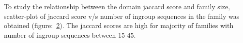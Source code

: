 \documentclass{article}
\begin{document}
		\begin{figure}
			\caption{}
			\label{fig:hist_domain_jaccard_scores_lgf5}
		\end{figure}
		
		To study the relationship between the domain jaccard score and family size, scatter-plot of jaccard score v/s number of ingroup sequences in the family was obtained (figure:~\ref{fig:scatter_domain_jaccard_vs_seq_ct_lgf5}). The jaccard scores are high for majority of families with number of ingroup sequences between 15-45.
		
		\begin{figure}
			\caption{}
			\label{fig:scatter_domain_jaccard_vs_seq_ct_lgf5}
		\end{figure}
		
\end{document}
